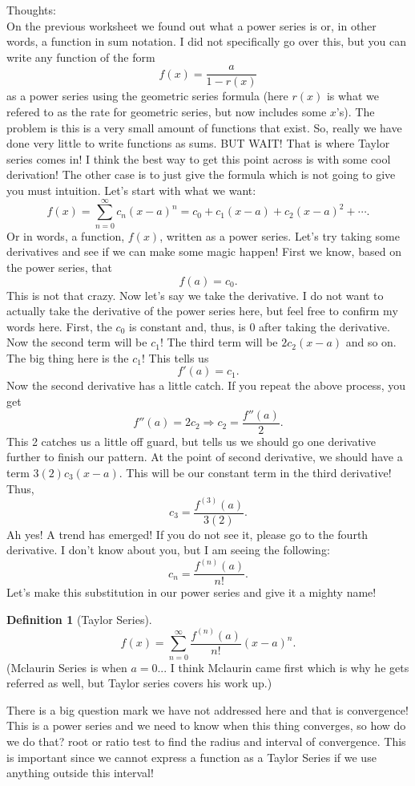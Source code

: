 \documentclass[10pt]{article}
\theoremstyle{Theorem}
\theoremstyle{definition}
\newtheorem{definition}{Definition}[section]
\theoremstyle{remark}
\theoremstyle{custom}
\begin{document}
\thispagestyle{firststyle}
\pagestyle{plain}


\noindent Thoughts: \\
On the previous worksheet we found out what a power series is or, in other words, a function in sum notation. I did not specifically go over this, but you can write any function of the form 
\[
f(x)=\dfrac{a}{1-r(x)}
\] 
as a power series using the geometric series formula (here $r(x)$ is what we refered to as the rate for geometric series, but now includes some $x$'s). The problem is this is a very small amount of functions that exist. So, really we have done very little to write functions as sums. BUT WAIT! That is where Taylor series comes in! I think the best way to get this point across is with some cool derivation! The other case is to just give the formula which is not going to give you must intuition. Let's start with what we want:
\[
f(x)=\sum_{n=0}^{\infty}c_n(x-a)^n=c_0+c_1(x-a)+c_2(x-a)^2+\cdots.
\]
Or in words, a function, $f(x)$, written as a power series. Let's try taking some derivatives and see if we can make some magic happen! First we know, based on the power series, that
\[
f(a)=c_0.
\]
This is not that crazy. Now let's say we take the derivative. I do not want to actually take the derivative of the power series here, but feel free to confirm my words here. First, the $c_0$ is constant and, thus, is 0 after taking the derivative. Now the second term will be $c_1$! The third term will be $2c_2(x-a)$ and so on. The big thing here is the $c_1$! This tells us
\[
f'(a)=c_1.
\]
Now the second derivative has a little catch. If you repeat the above process, you get 
\[
f''(a)=2c_2 \Rightarrow c_2=\dfrac{f''(a)}{2}.
\]
This 2 catches us a little off guard, but tells us we should go one derivative further to finish our pattern. At the point of second derivative, we should have a term $3(2)c_3(x-a)$. This will be our constant term in the third derivative! Thus,
\[
c_3=\dfrac{f^{(3)}(a)}{3(2)}.
\]
Ah yes! A trend has emerged! If you do not see it, please go to the fourth derivative.
I don't know about you, but I am seeing the following:
\[
c_n=\dfrac{f^{(n)}(a)}{n!}.
\]
Let's make this substitution in our power series and give it a mighty name!
\begin{definition}[Taylor Series]
\[
f(x)=\sum_{n=0}^{\infty}\dfrac{f^{(n)}(a)}{n!}(x-a)^n.
\]
(Mclaurin Series is when $a=0$... I think Mclaurin came first which is why he gets referred as well, but Taylor series covers his work up.)
\end{definition}
There is a big question mark we have not addressed here and that is convergence! This is a power series and we need to know when this thing converges, so how do we do that? root or ratio test to find the radius and interval of convergence. This is important since we cannot express a function as a Taylor Series if we use anything outside this interval!\\
\end{document}
